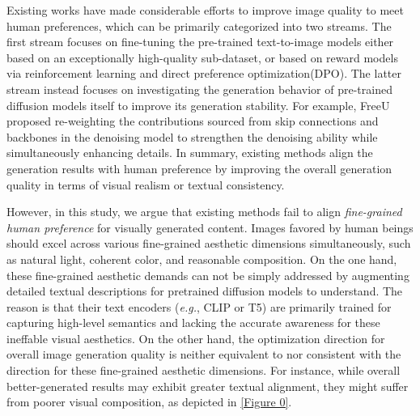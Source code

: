 Existing works have made considerable efforts to improve image quality to meet human preferences, which can be primarily categorized into two streams.
The first stream focuses on fine-tuning the pre-trained text-to-image models either based on an exceptionally high-quality sub-dataset\cite{dai2023emu}, or based on reward models via reinforcement learning\cite{liang2024rich, xu2024imagereward, kirstain2023pick} and direct preference optimization(DPO)\cite{wallace2024diffusion}.
The latter stream\cite{si2023freeu, he2024freestyle} instead focuses on investigating the generation behavior of pre-trained diffusion models itself to improve its generation stability.
For example, FreeU\cite{si2023freeu} proposed re-weighting the contributions sourced from skip connections and backbones in the denoising model to strengthen the denoising ability while simultaneously enhancing details.
In summary, existing methods align the generation results with human preference by improving the overall generation quality in terms of visual realism or textual consistency.

However, in this study, we argue that existing methods fail to align \emph{fine-grained human preference} for visually generated content.
Images favored by human beings should excel across various fine-grained aesthetic dimensions simultaneously, such as natural light, coherent color, and reasonable composition.
On the one hand, these fine-grained aesthetic demands can not be simply addressed by augmenting detailed textual descriptions for pretrained diffusion models to understand.
The reason is that their text encoders (\emph{e.g.}, CLIP\cite{radford2021learning} or T5\cite{raffel2020exploring}) are primarily trained for capturing high-level semantics and lacking the accurate awareness for these ineffable visual aesthetics.
On the other hand, the optimization direction for overall image generation quality is neither equivalent to nor consistent with the direction for these fine-grained aesthetic dimensions. 
For instance, while overall better-generated results may exhibit greater textual alignment, they might suffer from poorer visual composition, as depicted in \cref{Figure 0}.

